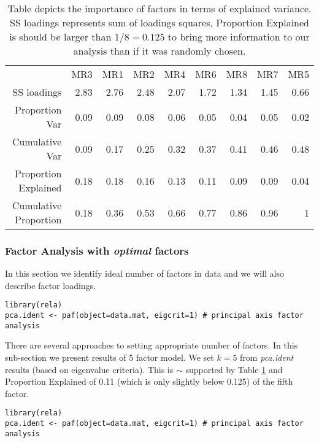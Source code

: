 \documentclass[10pt,a4paper]{article}
\begin{document}
\begin{table}[htbp]
  \centering
  \caption{Table depicts the importance of factors in terms of explained variance. SS loadings represents sum of loadings squares, Proportion Explained is should be larger than $1/8 = 0.125$ to bring more information to our analysis than if it was randomly chosen.}
    \begin{tabular}{rrrrrrrrr}
          & MR3   & MR1   & MR2   & MR4   & MR6   & MR8   & MR7   & MR5 \\
    SS loadings & 2.83  & 2.76  & 2.48  & 2.07  & 1.72  & 1.34  & 1.45  & 0.66 \\
    Proportion Var & 0.09  & 0.09  & 0.08  & 0.06  & 0.05  & 0.04  & 0.05  & 0.02 \\
    Cumulative Var & 0.09  & 0.17  & 0.25  & 0.32  & 0.37  & 0.41  & 0.46  & 0.48 \\
    \textcolor{NavyBlue}{Proportion Explained} & 0.18  & 0.18  & 0.16  & 0.13  & 0.11  & 0.09  & 0.09  & 0.04 \\
    Cumulative Proportion & 0.18  & 0.36  & 0.53  & 0.66  & 0.77  & 0.86  & 0.96  & 1 \\
    \end{tabular}%
  \label{t:var1}%
\end{table}%

\subsubsection{Factor Analysis with \emph{optimal} factors}
In this section we identify ideal number of factors in data and we will also describe factor loadings.
\begin{lstlisting}
library(rela)
pca.ident <- paf(object=data.mat, eigcrit=1) # principal axis factor analysis
\end{lstlisting}
There are several approaches to setting appropriate number of factors. In this sub-section we present results of 5 factor model. We set $k=5$ from \emph{pca.ident} results (based on eigenvalue criteria). This is $\sim$ supported by Table \ref{t:var1} and Proportion Explained of 0.11 (which is only slightly below 0.125) of the fifth factor. 

\begin{lstlisting}
library(rela)
pca.ident <- paf(object=data.mat, eigcrit=1) # principal axis factor analysis
\end{lstlisting}
\end{document}
